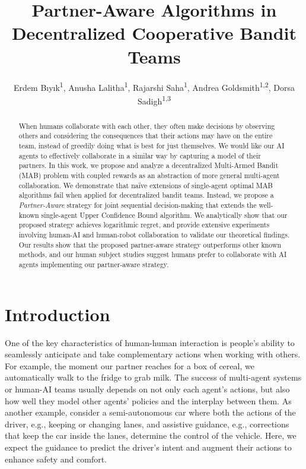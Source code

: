 \documentclass[letterpaper]{article} %
\title{Partner-Aware Algorithms in Decentralized Cooperative Bandit Teams}
\author {
    Erdem B\i y\i k\textsuperscript{\rm 1},
    Anusha Lalitha\textsuperscript{\rm 1},
    Rajarshi Saha\textsuperscript{\rm 1},
    Andrea Goldsmith\textsuperscript{\rm 1,2},
    Dorsa Sadigh\textsuperscript{\rm 1,3}\\
}
\theoremstyle{definition}
\begin{document}
\maketitle

\begin{abstract}
When humans collaborate with each other, they often make decisions by observing others and considering the consequences that their actions may have on the entire team, instead of greedily doing what is best for just themselves. We would like our AI agents to effectively collaborate in a similar way by capturing a model of their partners. In this work, we propose and analyze a decentralized Multi-Armed Bandit (MAB) problem with coupled rewards as an abstraction of more general multi-agent collaboration. We demonstrate that na\"ive extensions of single-agent optimal MAB algorithms fail when applied for decentralized bandit teams. Instead, we propose a \emph{Partner-Aware} strategy for joint sequential decision-making that extends the well-known single-agent Upper Confidence Bound algorithm. We analytically show that our proposed strategy achieves logarithmic regret, and provide extensive experiments involving human-AI and human-robot collaboration to validate our theoretical findings. Our results show that the proposed partner-aware strategy outperforms other known methods, and our human subject studies suggest humans prefer to collaborate with AI agents implementing our partner-aware strategy.
\end{abstract}

\section{Introduction}
\label{sec:intro}
One of the key characteristics of human-human interaction is people's ability to seamlessly anticipate and take complementary actions when working with others.
For example, the moment our partner reaches for a box of cereal, we automatically walk to the fridge to grab milk.
The success of multi-agent systems or human-AI teams usually depends on not only each agent's actions, but also how well they model other agents' policies and the interplay between them.
As another example, consider a semi-autonomous car where both the actions of the driver, e.g., keeping or changing lanes, and assistive guidance, e.g., corrections that keep the car inside the lanes, determine the control of the vehicle. Here, we expect the guidance to predict the driver's intent and augment their actions to enhance safety and comfort.
\end{document}
